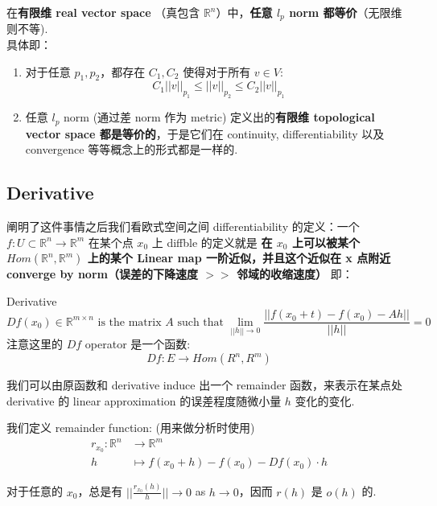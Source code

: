 \documentclass[lang=cn,11pt]{elegantbook}
\begin{document}
\begin{theorem}
    在\textbf{有限维 real vector space} （真包含 $\mathbb{R}^n$）中，\textbf{任意 $l_p$ norm 都等价}（无限维则不等).\\
    具体即：
    \begin{enumerate}
        \item 对于任意 $p_1, p_2$，都存在 $C_1, C_2$ 使得对于所有 $v\in V$:
        $$
        C_1||v||_{p_1} \leq ||v||_{p_2} \leq C_2||v||_{p_1}
        $$
        \item 任意 $l_p$ norm (通过差 norm 作为 metric) 定义出的\textbf{有限维 topological vector space 都是等价的}，于是它们在 continuity, differentiability 以及 convergence 等等概念上的形式都是一样的.
    \end{enumerate}
\end{theorem}

\subsection{Derivative}
\noindent 阐明了这件事情之后我们看欧式空间之间 differentiability 的定义：一个 $f: U \subset \mathbb{R}^n \rightarrow \mathbb{R}^m$ 在某个点 $x_0$ 上 diffble 的定义就是 \textbf{在 $x_0$ 上可以被某个 $Hom(\mathbb{R}^n, \mathbb{R}^m)$ 上的某个 Linear map 一阶近似，并且这个近似在 x 点附近 converge by norm（误差的下降速度 $>>$ 邻域的收缩速度）}
即：
\begin{definition}{Derivative} \label{derivartive}
    $$
    Df(x_0) \in \mathbb{R}^{m \times n} \text{ is the matrix } A \text{ such that } \lim_{||h|| \rightarrow 0} \frac{||f(x_0 + t) - f(x_0) - Ah||}{||h||} = 0
    $$
    注意这里的 $Df$ operator 是一个函数:
    $$
    Df : E \rightarrow Hom(R^n, R^m)
    $$
\end{definition}

我们可以由原函数和 derivative induce 出一个 remainder 函数，来表示在某点处 derivative 的 linear approximation 的误差程度随微小量 $h$ 变化的变化. 

\begin{definition}
我们定义 remainder function: (用来做分析时使用)
\begin{align}
    r_{x_0} : \mathbb{R}^n &  \rightarrow \mathbb{R}^m \\
    h & \mapsto f(x_0 + h) - f(x_0) - Df(x_0) \cdot h
\end{align}
\end{definition}

\noindent 对于任意的 $x_0$，总是有 $||\frac{r_{x_0}(h)}{h}|| \rightarrow 0$ as $h \rightarrow 0$，因而 $r(h)$ 是 $o(h)$ 的.
\end{document}
